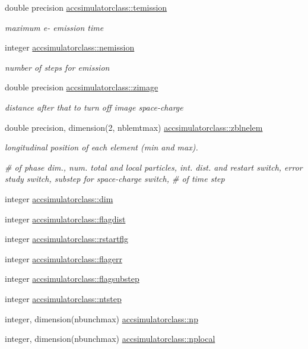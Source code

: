 \begin{DoxyCompactItemize}
double precision \mbox{\hyperlink{namespaceaccsimulatorclass_a28fd069f7896f70d589d4c2cfbba638c}{accsimulatorclass\+::temission}}
\begin{DoxyCompactList}\small\item\em maximum e-\/ emission time \end{DoxyCompactList}\item 
integer \mbox{\hyperlink{namespaceaccsimulatorclass_ac85830b9ae1f5fcb8b361a0289a3642c}{accsimulatorclass\+::nemission}}
\begin{DoxyCompactList}\small\item\em number of steps for emission \end{DoxyCompactList}\item 
double precision \mbox{\hyperlink{namespaceaccsimulatorclass_ad3a023e393184d37840a4df908394121}{accsimulatorclass\+::zimage}}
\begin{DoxyCompactList}\small\item\em distance after that to turn off image space-\/charge \end{DoxyCompactList}\item 
double precision, dimension(2, nblemtmax) \mbox{\hyperlink{namespaceaccsimulatorclass_a948cfd87a75472c1a7dd8033d8240cb8}{accsimulatorclass\+::zblnelem}}
\begin{DoxyCompactList}\small\item\em longitudinal position of each element (min and max). \end{DoxyCompactList}\end{DoxyCompactItemize}
\textbf{ }\par
{\em \# of phase dim., num. total and local particles, int. dist. and restart switch, error study switch, substep for space-\/charge switch, \# of time step }\begin{DoxyCompactItemize}
\item 
integer \mbox{\hyperlink{namespaceaccsimulatorclass_a1bb17d60d29b17243f030da4fdff1da0}{accsimulatorclass\+::dim}}
\item 
integer \mbox{\hyperlink{namespaceaccsimulatorclass_a341b7d5bedde986513f3acce4e6241c1}{accsimulatorclass\+::flagdist}}
\item 
integer \mbox{\hyperlink{namespaceaccsimulatorclass_a8f9d158cfc4cf78532f6c4260c64e40b}{accsimulatorclass\+::rstartflg}}
\item 
integer \mbox{\hyperlink{namespaceaccsimulatorclass_a93593dcb7424a2998a1a96e9b174f886}{accsimulatorclass\+::flagerr}}
\item 
integer \mbox{\hyperlink{namespaceaccsimulatorclass_a686d2f05ae5ba90a11746493b7344b07}{accsimulatorclass\+::flagsubstep}}
\item 
integer \mbox{\hyperlink{namespaceaccsimulatorclass_ad17bd82c1342d540df6b01e26bb6a6c5}{accsimulatorclass\+::ntstep}}
\item 
integer, dimension(nbunchmax) \mbox{\hyperlink{namespaceaccsimulatorclass_a9b5412b4e15fa5ef3285339a39130a08}{accsimulatorclass\+::np}}
\item 
integer, dimension(nbunchmax) \mbox{\hyperlink{namespaceaccsimulatorclass_a8256e3807dbd57a588c3f79c400a9c04}{accsimulatorclass\+::nplocal}}
\end{DoxyCompactItemize}

